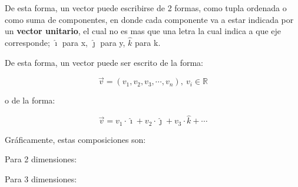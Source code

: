     De esta forma, un vector puede escribirse de 2 formas, como tupla ordenada
    o como suma de componentes, en donde cada componente va a estar indicada
    por un \textbf{vector unitario}, el cual no es mas que una letra la cual
    indica a que eje corresponde; $\hat{\imath}$ para x, $\hat{\jmath}$ para y,
    $\hat{k}$ para k.

    De esta forma, un vector puede ser escrito de la forma:

    $$\vec{v}=(v_1,v_2,v_3,\cdots,v_n),\ v_i \in \mathbb{R}$$


    o de la forma:

    $$\vec{v}=v_1\cdot\hat{\imath}+v_2\cdot\hat{\jmath}+v_3\cdot\hat{k}+\cdots$$

    Gráficamente, estas composiciones son:

    Para 2 dimensiones:



    Para 3 dimensiones:


